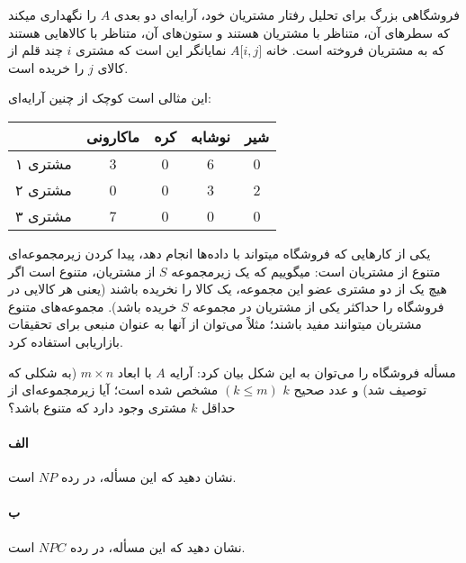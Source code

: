 \documentclass[]{article}
\begin{document}
فروشگاهی بزرگ برای تحلیل رفتار مشتریان خود، آرایه‌ای دو بعدی $A$ را نگهداری میکند
که سطرهای آن، متناظر با مشتریان هستند و ستون‌های آن، متناظر با کالاهایی هستند که به مشتریان فروخته است.
خانه $A \lbrack i, j \rbrack$ نمایانگر این است که مشتری $i$ چند قلم از کالای $j$ را خریده است.

این مثالی است کوچک از چنین آرایه‌ای:

\begin{center}
    \begin{tabular}{ |c | c | c | c | c | }
    \hline
        & ماکارونی & کره & نوشابه & شیر \\ [0.05cm]
    \hline
        مشتری ۱ & 3 & 0 & 6 & 0 \\ [0.05cm]
        مشتری ۲ & 0 & 0 & 3 & 2 \\ [0.05cm]
        مشتری ۳ & 7 & 0 & 0 & 0 \\ [0.05cm]
    \hline
    \end{tabular}
\end{center}
یکی از کارهایی که فروشگاه میتواند با داده‌ها انجام دهد، پیدا کردن زیرمجموعه‌ای متنوع از مشتریان است:
میگوییم که یک زیرمجموعه $S$ از مشتریان، متنوع است اگر هیچ یک از دو مشتری عضو این مجموعه،
یک کالا را نخریده باشند (یعنی هر کالایی در فروشگاه را حداکثر یکی از مشتریان در مجموعه $S$ خریده باشد). 
مجموعه‌های متنوع مشتریان میتوانند مفید باشند؛ مثلاً می‌توان از آنها به عنوان منبعی برای تحقیقات بازاریابی استفاده کرد.

مسأله فروشگاه را می‌توان به این شکل بیان کرد: 
آرایه $A$ با ابعاد $m \times n$ (به شکلی که توصیف شد)
و عدد صحیح $k$ $(k \leq m)$ مشخص شده است؛
آیا زیرمجموعه‌ای از حداقل $k$ مشتری وجود دارد که متنوع باشد؟

\paragraph*{الف}
نشان دهید که این مسأله، در رده $NP$ است.
\paragraph*{ب}
نشان دهید که این مسأله، در رده $NPC$ است.
\end{document}

